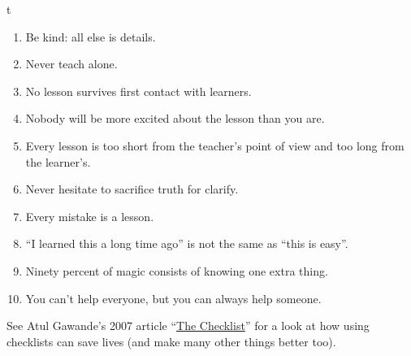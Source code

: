 t


\begin{enumerate}

\item Be kind: all else is details.

\item Never teach alone.

\item No lesson survives first contact with learners.

\item Nobody will be more excited about the lesson than you are.

\item Every lesson is too short from the teacher's point of view and too long from the learner's.

\item Never hesitate to sacrifice truth for clarify.

\item Every mistake is a lesson.

\item ``I learned this a long time ago'' is not the same as ``this is easy''.

\item Ninety percent of magic consists of knowing one extra thing.

\item You can't help everyone, but you can always help someone.

\end{enumerate}


See Atul Gawande's 2007 article
``\href{http://www.newyorker.com/magazine/2007/12/10/the-checklist}{The
Checklist}'' for a look at how using checklists can save lives (and make
many other things better too).

